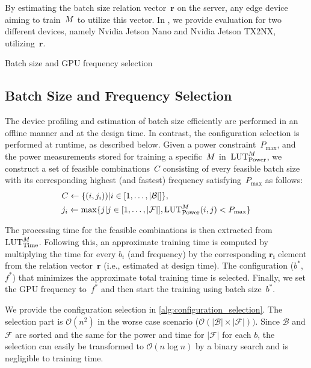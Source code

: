 By estimating the batch size relation vector~$\mathbf{r}$ on the server, any edge device aiming to train~$M$ to utilize this vector. In , we provide evaluation for two different devices, namely Nvidia Jetson Nano and Nvidia Jetson TX2NX, utilizing~$\mathbf{r}$. 



\begin{algorithm}[tb!]
    \caption{Batch size and GPU frequency selection}
    \label{alg:configuration_selection}
        
\end{algorithm}
\subsection{Batch Size and Frequency Selection}
\label{subsec:selection}
The device profiling and estimation of batch size efficiently are performed in an offline manner and at the design time. In contrast, the configuration selection is performed at runtime, as described below.
Given a power constraint~$P_{\text{max}}$, and the power measurements stored for training a specific~$M$ in~$\text{LUT}^{M}_{\text{Power}}$, we construct a set of feasible combinations~$C$ consisting of every feasible batch size with its corresponding highest (and fastest) frequency satisfying~$P_\text{max}$ as follows: 
\begin{equation}
    \begin{aligned}
    &C \gets \{(i, j_{i})) | i \in [1, \ldots, |\mathcal{B}|] \}, \\
    &j_{i} \gets \max \{j| j \in [1, \ldots, |\mathcal{F}|], \text{LUT}^{M}_{\text{Power}}(i, j) < P_{\text{max}}\} 
    \end{aligned}
\label{eq:feasible_combination}
\end{equation}

The processing time for the feasible combinations is then extracted from~$\text{LUT}^{M}_{\text{Time}}$. Following this, an approximate training time is computed by multiplying the time for every $b_{i}$ (and frequency) by the corresponding $\mathbf{r_{i}}$ element from the relation vector~$\mathbf{r}$ (i.e., estimated at design time). The configuration ($b^{*}$, $f^{*}$) that minimizes the approximate total training time is selected. Finally, we set the GPU frequency to~$f^{*}$ and then start the training using batch size~$b^{*}$. 
 

    
We provide the configuration selection in \cref{alg:configuration_selection}. The selection part is $\mathcal{O}(n^{2})$ in the worse case scenario ($\mathcal{O}(|\mathcal{B}| \times |\mathcal{F}|))$. Since $\mathcal{B}$ and $\mathcal{F}$ are sorted and the same for the power and time for $|\mathcal{F}|$ for each $b$, the selection can easily be transformed to $\mathcal{O}(n\log n)$ by a binary search and is negligible to training time.


